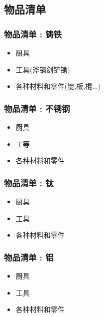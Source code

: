 {{  }

  \subsection{物品清单}{

      \subsubsection{物品清单 : 铸铁}{
          \begin{itemize}
              \item 厨具
              \item 工具(斧镐剑铲锄)
              \item 各种材料和零件(锭,板,棍...)
          \end{itemize}
      }

      \subsubsection{物品清单 : 不锈钢}{
          \begin{itemize}
              \item 厨具
              \item 工等
              \item 各种材料和零件
          \end{itemize}
      }

      \subsubsection{物品清单 : 钛}{
          \begin{itemize}
              \item 厨具
              \item 工具
              \item 各种材料和零件
          \end{itemize}
      }

      \subsubsection{物品清单 : 铝}{
          \begin{itemize}
              \item 厨具
              \item 工具
              \item 各种材料和零件
          \end{itemize}
      }

}}
